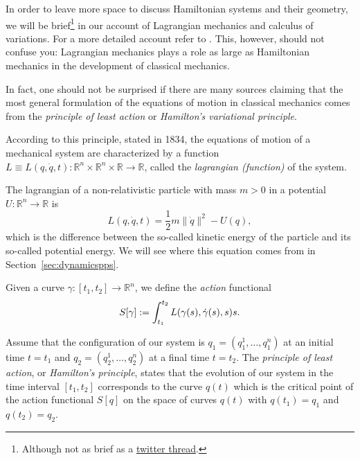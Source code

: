 \documentclass[english,fontsize=11pt,paper=a5,oneside]{scrbook}
\newcommand{\R}{\mathbb{R}}
\let\d\relax
\newcommand{\d}{\mathrm{d}}
\theoremstyle{definition}
\newenvironment{example}
  {\pushQED{\qed}\renewcommand{\qedsymbol}{$\lozenge$}\examplex}
  {\popQED\endexamplex}
\begin{document}
In order to leave more space to discuss Hamiltonian systems and their geometry, we will be brief\footnote{Although not as brief as a \href{https://twitter.com/j\_bertolotti/status/1397159397596581889}{twitter thread}.} in our account of Lagrangian mechanics and calculus of variations. For a more detailed account refer to \cite[Part II]{book:arnold}.
This, however, should not confuse you: Lagrangian mechanics plays a role as large as Hamiltonian mechanics in the development of classical mechanics.

In fact, one should not be surprised if there are many sources claiming that the most general formulation of the equations of motion in classical mechanics comes from the \emph{principle of least action} or \emph{Hamilton's variational principle}.

According to this principle, stated in 1834, the equations of motion of a mechanical system are characterized by a function $L \equiv L(q, \dot q, t) : \R^n \times \R^n \times \R \to \R$, called the \emph{lagrangian (function)} of the system.

\begin{example}
  The lagrangian of a non-relativistic particle with mass $m > 0$ in a potential $U : \R^n \to \R$ is
  \begin{equation}
    L(q, \dot q, t) = \frac12 m \|\dot q\|^2 - U(q),
  \end{equation}
  which is the difference between the so-called kinetic energy of the particle and its so-called potential energy.
  We will see where this equation comes from in Section~\ref{sec:dynamicspps}.
\end{example}

Given a curve $\gamma:[t_1, t_2] \to \R^n$, we define the \emph{action} functional
\begin{equation}\label{eq:Laction}
  S[\gamma] := \int_{t_1}^{t_2} L(\gamma(s), \dot \gamma(s), s) \d s.
\end{equation}

\begin{tcolorbox}
  Assume that the configuration of our system is $q_1 = (q_1^1, \ldots, q_1^n)$ at an initial time $t=t_1$ and $q_2 = (q_2^1, \ldots, q_2^n)$ at a final time $t = t_2$. The \emph{principle of least action}, or \emph{Hamilton's principle}, states that the evolution of our system in the time interval $[t_1, t_2]$ corresponds to the curve $q(t)$ which is the critical point of the action functional $S[q]$ on the space of curves $q(t)$ with $q(t_1) = q_1$ and $q(t_2) = q_2$.
\end{tcolorbox}
\end{document}
